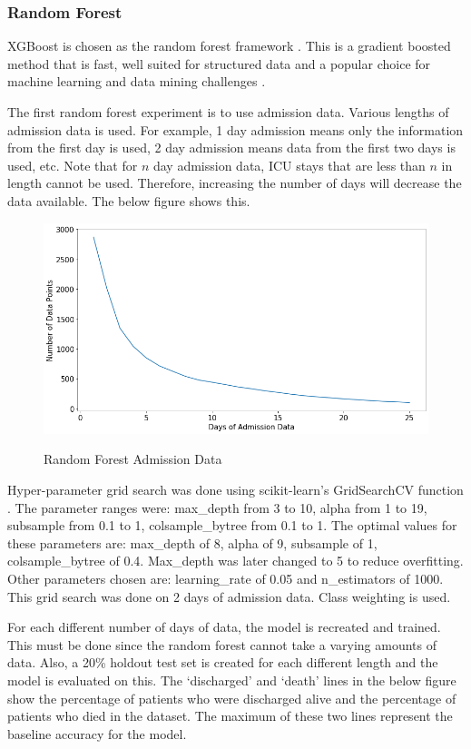 \documentclass[12pt]{article}
\begin{document}
\subsubsection{Random Forest}
XGBoost is chosen as the random forest framework \cite{XGBoost}. This is a gradient boosted method that is fast, well suited for structured data and a popular choice for machine learning and data mining challenges \cite{XGBoostUsage}. 

The first random forest experiment is to use admission data. Various lengths of admission data is used. For example, 1 day admission means only the information from the first day is used, 2 day admission means data from the first two days is used, etc. Note that for $n$ day admission data, ICU stays that are less than $n$ in length cannot be used. Therefore, increasing the number of days will decrease the data available. The below figure shows this.

\begin{figure}[H]
\centering\caption{Random Forest Admission Data}
\includegraphics[scale=0.52]{Random Forest Admission Data.png}
\label{Random Forest Admission Data}
\end{figure}

Hyper-parameter grid search was done using  scikit-learn's GridSearchCV function \cite{scikit-learn}. The parameter ranges were: max\_depth from 3 to 10, alpha from 1 to 19, subsample from 0.1 to 1, colsample\_bytree from 0.1 to 1. The optimal values for these parameters are: max\_depth of 8, alpha of 9, subsample of 1, colsample\_bytree of 0.4. Max\_depth was later changed to 5 to reduce overfitting. Other parameters chosen are: learning\_rate of 0.05 and n\_estimators of 1000. This grid search was done on 2 days of admission data. Class weighting is used.

For each different number of days of data, the model is recreated and trained. This must be done since the random forest cannot take a varying amounts of data. Also, a 20\% holdout test set is created for each different length and the model is evaluated on this. The `discharged' and `death' lines in the below figure show the percentage of patients who were discharged alive and the percentage of patients who died in the dataset. The maximum of these two lines represent the baseline accuracy for the model. 
\end{document}
